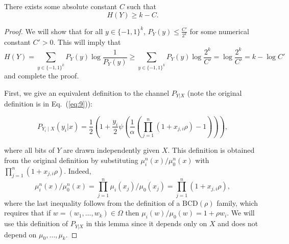 \documentclass[final, 12pt]{colt2018}
\providecommand{\BCD}{\mathrm{BCD}}
\renewcommand{\eqref}[1]{Eq.~(\ref{#1})}
\begin{document}
\begin{lemma} \label{lem:ent}
There exists some absolute constant $C$ such that
\[
H(Y) \ge k - C.
\]
\end{lemma}

\begin{proof}
We will show that for all $y \in \{-1,1\}^k$, $P_{Y}(y) \le \frac{C'}{2^k}$ for some numerical constant $C'>0$. This will imply that
\begin{equation}\label{eq:522}
H(Y)
= \sum_{y \in \{-1,1\}^k} P_Y(y) \log \frac{1}{P_Y(y)}
\ge \sum_{y \in \{-1,1\}^k} P_Y(y) \log \frac{2^k}{C'}
= \log \frac{2^k}{C'}
= k - \log C'
\end{equation}
and complete the proof.

First, we give an equivalent definition to the channel $P_{Y|X}$ (note the original definition is in \eqref{eq:9}):

\begin{equation} \label{eq:YXnew}
P_{Y_i \mid X}(y_i | x) = \frac{1}{2} \left( 1 + \frac{y_i}{2} \psi \left( \frac{1}{\alpha} \left( \prod_{j=1}^{n} (1 + x_{j,i} \rho) - 1 \right) \right) \right),
\end{equation}

where all bits of $Y$ are drawn independently given $X$. This definition is obtained from the original definition by substituting $\mu_i^n(x)/\mu_0^n(x)$ with $\prod_{j=1}^{n} (1 + x_{j,i} \rho)$. Indeed,
\[
\mu_i^n(x)/\mu_0^n(x)
= \prod_{j=1}^n \mu_i(x_j)/\mu_0(x_j)
= \prod_{j=1}^n (1+ x_{j,i}\rho),
\]
where the last inequality follows from the definition of a $\BCD(\rho)$ family, which requires that if $w=(w_1,\dots,w_k) \in \Omega$  then $\mu_i(w)/\mu_0(w) = 1 + \rho w_i$. We will use this definition of $P_{Y|X}$ in this lemma since it depends only on $X$ and does not depend on $\mu_0,\dots, \mu_k$.


\end{proof}
\end{document}
